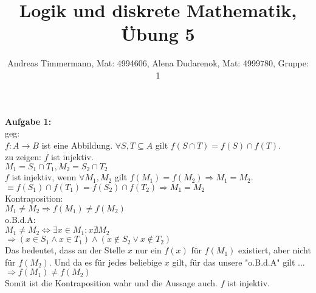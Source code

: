 \documentclass[a4paper]{scrartcl}
\title{Logik und diskrete Mathematik, Übung 5}
\author{Andreas Timmermann, Mat: 4994606, Alena Dudarenok, Mat: 4999780, Gruppe: 1}
\begin{document}
	\maketitle
	\begin{flushleft}
		\textbf{Aufgabe 1:}\\
		geg:\\
		$f:A\rightarrow B$ ist eine Abbildung. $\forall S,T\subseteq A$ gilt $f(S\cap T)=f(S)\cap f(T)$.\\
		zu zeigen: $f$ ist injektiv.\\[1em]
		$M_1 = S_1\cap T_1,M_2 = S_2\cap T_2$\\
		$f$ ist injektiv, wenn $\forall M_1,M_2$ gilt $f(M_1) = f(M_2)\Rightarrow M_1 = M_2$.\\ 
		$\equiv f(S_1)\cap f(T_1) = f(S_2)\cap f(T_2)\Rightarrow M_1 = M_2$\\[1em]
		Kontraposition:\\
		$M_1 \neq M_2 \Rightarrow f(M_1) \neq f(M_2)$\\
		o.B.d.A:\\
		$M_1 \neq M_2 \Leftrightarrow \exists x\in M_1: x\nexists M_2$\\
		$\Rightarrow (x\in S_1 \wedge x\in T_1) \wedge (x\notin S_2 \vee x\notin T_2)$\\
		Das bedeutet, dass an der Stelle $x$ nur ein $f(x)$ für $f(M_1)$ existiert, aber nicht für $f(M_2)$. Und da es für jedes beliebige $x$ gilt, für das unsere "o.B.d.A" gilt ...\\
		$\Rightarrow f(M_1)\neq f(M_2)$\\
		Somit ist die Kontraposition wahr und die Aussage auch. $f$ ist injektiv.
	\end{flushleft}
\end{document}
